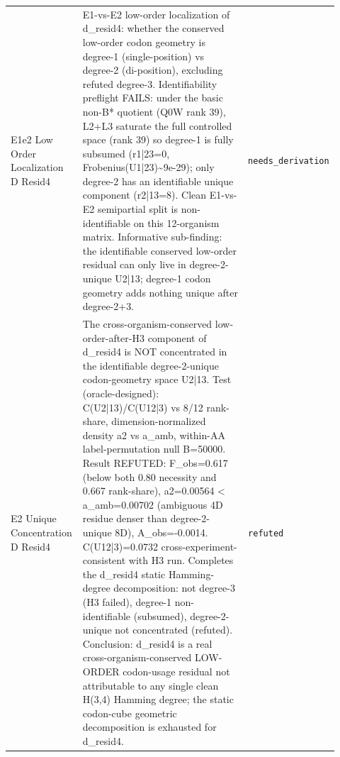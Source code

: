 \begin{longtable}{>{\raggedright\arraybackslash}p{0.22\linewidth}>{\raggedright\arraybackslash}p{0.55\linewidth}>{\raggedright\arraybackslash}p{0.15\linewidth}}
E1e2 Low Order Localization D Resid4 & E1-vs-E2 low-order localization of d\_resid4: whether the conserved low-order codon geometry is degree-1 (single-position) vs degree-2 (di-position), excluding refuted degree-3. Identifiability preflight FAILS: under the basic non-B* quotient (Q0W rank 39), L2+L3 saturate the full controlled space (rank 39) so degree-1 is fully subsumed (r1|23=0, Frobenius(U1|23)\textasciitilde{}9e-29); only degree-2 has an identifiable unique component (r2|13=8). Clean E1-vs-E2 semipartial split is non-identifiable on this 12-organism matrix. Informative sub-finding: the identifiable conserved low-order residual can only live in degree-2-unique U2|13; degree-1 codon geometry adds nothing unique after degree-2+3. & \texttt{needs\_derivation} \\
E2 Unique Concentration D Resid4 & The cross-organism-conserved low-order-after-H3 component of d\_resid4 is NOT concentrated in the identifiable degree-2-unique codon-geometry space U2|13. Test (oracle-designed): C(U2|13)/C(U12|3) vs 8/12 rank-share, dimension-normalized density a2 vs a\_amb, within-AA label-permutation null B=50000. Result REFUTED: F\_obs=0.617 (below both 0.80 necessity and 0.667 rank-share), a2=0.00564 < a\_amb=0.00702 (ambiguous 4D residue denser than degree-2-unique 8D), A\_obs=-0.0014. C(U12|3)=0.0732 cross-experiment-consistent with H3 run. Completes the d\_resid4 static Hamming-degree decomposition: not degree-3 (H3 failed), degree-1 non-identifiable (subsumed), degree-2-unique not concentrated (refuted). Conclusion: d\_resid4 is a real cross-organism-conserved LOW-ORDER codon-usage residual not attributable to any single clean H(3,4) Hamming degree; the static codon-cube geometric decomposition is exhausted for d\_resid4. & \texttt{refuted} \\

\end{longtable}
